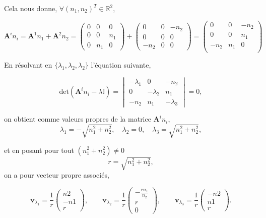 \documentclass[a4paper,oneside,10pt]{report}
\begin{document}
Cela nous donne, $\forall (n_1,n_2 )^T \in \mathbb{R}^2$,

\begin{equation}
\mathbf{A}^i n_i = \mathbf{A}^1 n_1 + \mathbf{A}^2 n_2 =
\begin{pmatrix}
0 & 0 & 0\\
0 & 0 & n_1\\
0 & n_1 & 0
\end{pmatrix}
+
\begin{pmatrix}
0 & 0 & -n_2\\
0 & 0 & 0\\
-n_2 & 0 & 0
\end{pmatrix}
=
\begin{pmatrix}
0 & 0 & -n_2\\
0 & 0 & n_1\\
-n_2 & n_1 & 0\\
\end{pmatrix}
\end{equation}


En résolvant en $\{\lambda_1,\lambda_2,\lambda_2\}$ l'équation suivante,

\begin{equation}
\mbox{det} (\mathbf{A}^i n_i - \lambda\mathbb{I}) =
\begin{vmatrix}
-\lambda_1 & 0 & -n_2\\
0 & -\lambda_2 & n_1\\
-n_2 & n_1 & -\lambda_3
\end{vmatrix}
=0,
\end{equation}

on obtient comme valeurs propres de la matrice $\mathbf{A}^i n_i$, 
\begin{equation}
\label{eq:vp}
\lambda_1 = -\sqrt{n_1^2 + n_2^2},\quad \lambda_2 =0,\quad \lambda_3 = \sqrt{n_1^2 + n_2^2},
\end{equation}

et en posant pour tout $(n_1^2 + n_2^2) \neq 0 $ 
$$r=\sqrt{n_1^2 + n_2^2},$$
 on a pour vecteur propre associés,

\begin{equation}
\mathbf{v}_{\lambda_1}=\frac{1}{r}
\begin{pmatrix}
n2\\
-n1\\
r
\end{pmatrix},
\qquad
\mathbf{v}_{\lambda_2}=\frac{1}{r}
\begin{pmatrix}
-\frac{rn_1}{n_2}\\
r\\
0
\end{pmatrix},
\qquad
\mathbf{v}_{\lambda_3}=\frac{1}{r}
\begin{pmatrix}
-n2\\
n1\\
r
\end{pmatrix}.
\end{equation}
\end{document}
